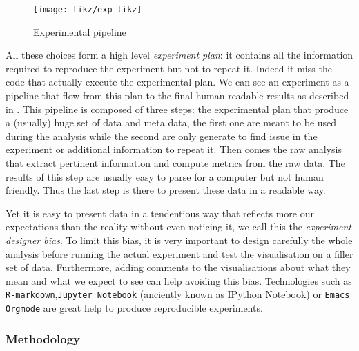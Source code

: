 \begin{figure}[htb]
    \centering
    \texttt{[image: tikz/exp-tikz]}
    \caption{Experimental pipeline}
    \label{fig:exp-pipeline}
\end{figure}

All these choices form a high level \emph{experiment plan}: it contains all
the information required to reproduce the experiment but not to repeat it.
Indeed it miss the code that actually execute the experimental plan.
We can see an experiment as a pipeline that flow from this plan to the final
human readable results as described in . This pipeline is
composed of three steps: the experimental plan that produce a (usually) huge
set of data and meta data, the first one are meant to be used during the
analysis while the second are only generate to find issue in the experiment or
additional information to repeat it. Then comes the raw analysis that extract
pertinent information and compute metrics from the raw data. The results of
this step are usually easy to parse for a computer but not human friendly.
Thus the last step is there to present these data in a readable way.

Yet it is easy to present data in a tendentious way that reflects more our
expectations than the reality without even noticing it, we call this the
\emph{experiment designer bias}. To limit this bias,
it is very important to design carefully the whole analysis before running the
actual experiment and test the visualisation on a filler set of data.
Furthermore, adding comments to the visualisations about what they mean and
what we expect to see can help avoiding this bias. Technologies such as
\texttt{R-markdown},\texttt{Jupyter Notebook} (anciently known as IPython
Notebook) or \texttt{Emacs Orgmode} are great help to produce reproducible
experiments.

\subsubsection{Methodology}

